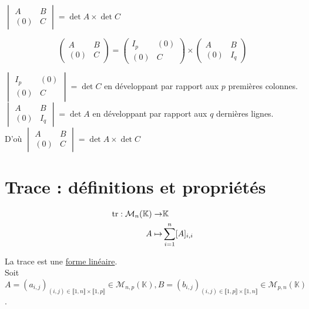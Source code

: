 \documentclass[]{article}
\begin{document}
\underline{$ \begin{vmatrix}
    A & B \\
    (0) & C
\end{vmatrix} = \det A \times \det C$}

\[ \begin{pmatrix}
    A & B \\
    (0) & C
\end{pmatrix} = \begin{pmatrix}
    I_p & (0) \\
    (0) & C
\end{pmatrix} \times \begin{pmatrix}
    A & B \\
    (0) & I_q
\end{pmatrix} \]

$\begin{vmatrix}
    I_p & (0) \\
    (0) & C
\end{vmatrix} = \det C$ en développant par rapport aux $p$ premières colonnes. \\

$\begin{vmatrix}
    A & B \\
    (0) & I_q
\end{vmatrix} = \det A$ en développant par rapport aux $q$ dernières lignes. \\

D'où $ \begin{vmatrix}
    A & B \\
    (0) & C
\end{vmatrix} = \det A \times \det C$

\section{Trace : définitions et propriétés}

\begin{align*} 
    \text{tr} : \mathcal{M}_n(\mathbb{K}) \rightarrow & \mathbb{K} \\
    A \mapsto & \sum_{i=1}^n [A]_{i, i} 
\end{align*}

La trace est une \underline{forme linéaire}. \\

Soit $A = (a_{i, j})_{(i, j) \in \llbracket 1, n \rrbracket \times \llbracket 1, p \rrbracket} \in \mathcal{M}_{n, p}(\mathbb{K}), B = (b_{i, j})_{(i, j) \in \llbracket 1, p \rrbracket \times \llbracket 1, n \rrbracket} \in \mathcal{M}_{p, n}(\mathbb{K})$. \\
\end{document}
